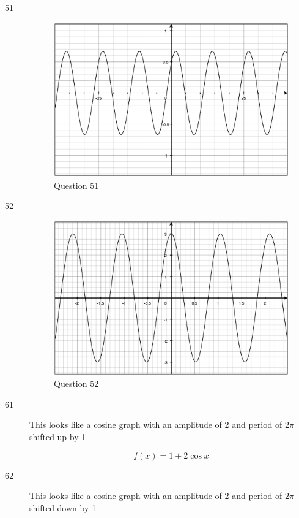 \documentclass[fleqn,addpoints]{exam}
\begin{document}
\begin{description}
\item[51]
\begin{figure}[H]
  \centering
  \includegraphics[scale=.3]{question51.eps}
  \caption*{Question 51}
\end{figure}

\item[52]
\begin{figure}[H]
  \centering
  \includegraphics[scale=.3]{question52.eps}
  \caption*{Question 52}
\end{figure}

\item[61]
This looks like a cosine graph with an amplitude of 2 and period of  $2 \pi$ shifted up by 1

\[
  f(x) = 1 + 2 \cos x
\]

\item[62]
This looks like a cosine graph with an amplitude of 2 and period of  $2 \pi$ shifted down by 1


\end{description}
\end{document}
